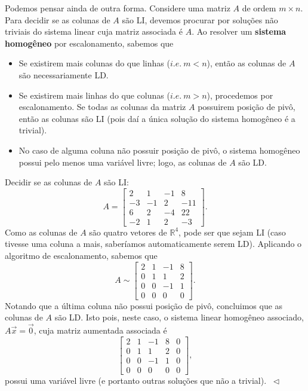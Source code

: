 Podemos pensar ainda de outra forma. Considere uma matriz $A$ de ordem $m\times n.$ Para decidir se as colunas de $A$ são LI, devemos procurar por soluções não triviais do sistema linear cuja matriz associada é $A$. Ao resolver um \textbf{sistema homogêneo} por escalonamento, sabemos que
\begin{itemize}
  \item Se existirem mais colunas do que linhas ($i.e. \ m<n$), então as colunas de $A$ são necessariamente LD.
  \item Se existirem mais linhas do que colunas ($i.e. \ m>n$), procedemos por escalonamento. Se todas as colunas da matriz $A$ possuirem posição de pivô, então as colunas são LI (pois daí a única solução do sistema homogêneo é a trivial). 
  \item No caso de alguma coluna não possuir posição de pivô, o sistema homogêneo possui pelo menos uma variável livre; logo, as colunas de $A$ são LD.
\end{itemize}

\begin{ex}
Decidir se as colunas de $A$ são LI:
\begin{equation}
A = \left[
\begin{array}{rrrr}
   2&1&-1&8\\
   -3&-1&2&-11\\
   6&2&-4&22\\
   -2&1&2&-3
\end{array}
\right].
\end{equation} Como as colunas de $A$ são quatro vetores de $\mathbb{R}^4$, pode ser que sejam LI (caso tivesse uma coluna a mais, saberíamos automaticamente serem LD). Aplicando o algoritmo de escalonamento, sabemos que
\begin{equation}
A \sim \left[
\begin{array}{cccc}
   2&1&-1&8\\
   0&1&1&2\\
   0&0&-1&1\\
   0&0&0&0
\end{array}
\right].
\end{equation} Notando que a última coluna não possui posição de pivô, concluimos que as colunas de $A$ são LD. Isto pois, neste caso, o sistema linear homogêneo associado, $A \vec{x} = \vec{0}$, cuja matriz aumentada associada é
\begin{equation}
\left[
\begin{array}{cccc|c}
   2&1&-1&8&0\\
   0&1&1&2& 0\\
   0&0&-1&1&0\\
   0&0&0&0&0
\end{array}
\right],
\end{equation} possui uma variável livre (e portanto outras soluções que não a trivial). $\ \lhd$
\end{ex}

